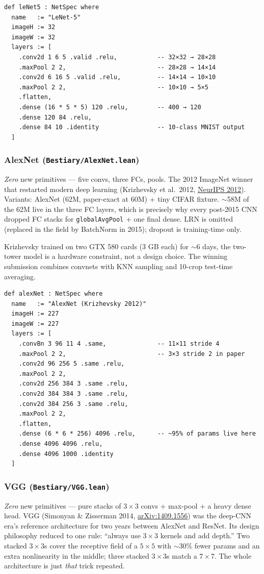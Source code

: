 \begin{verbatim}
def leNet5 : NetSpec where
  name   := "LeNet-5"
  imageH := 32
  imageW := 32
  layers := [
    .conv2d 1 6 5 .valid .relu,           -- 32×32 → 28×28
    .maxPool 2 2,                         -- 28×28 → 14×14
    .conv2d 6 16 5 .valid .relu,          -- 14×14 → 10×10
    .maxPool 2 2,                         -- 10×10 → 5×5
    .flatten,
    .dense (16 * 5 * 5) 120 .relu,        -- 400 → 120
    .dense 120 84 .relu,
    .dense 84 10 .identity                -- 10-class MNIST output
  ]
\end{verbatim}

\subsubsection*{AlexNet (\texttt{Bestiary/AlexNet.lean})}
\emph{Zero} new primitives --- five convs, three FCs, pools. The 2012
ImageNet winner that restarted modern deep learning (Krizhevsky et al.\ 2012,
\href{https://papers.nips.cc/paper_files/paper/2012/hash/c399862d3b9d6b76c8436e924a68c45b-Abstract.html}{NeurIPS 2012}). Variants:
AlexNet (62M, paper-exact at 60M) + tiny CIFAR fixture. $\sim$58M of
the 62M live in the three FC layers, which is precisely why every
post-2015 CNN dropped FC stacks for \texttt{globalAvgPool} + one final
dense. LRN is omitted (replaced in the field by BatchNorm in 2015);
dropout is training-time only.

Krizhevsky trained on two GTX 580 cards (3 GB each) for $\sim$6 days,
the two-tower model is a hardware constraint, not a design choice.
The winning submission combines convnets with KNN sampling and
10-crop test-time averaging.

\begin{verbatim}
def alexNet : NetSpec where
  name   := "AlexNet (Krizhevsky 2012)"
  imageH := 227
  imageW := 227
  layers := [
    .convBn 3 96 11 4 .same,              -- 11×11 stride 4
    .maxPool 2 2,                         -- 3×3 stride 2 in paper
    .conv2d 96 256 5 .same .relu,
    .maxPool 2 2,
    .conv2d 256 384 3 .same .relu,
    .conv2d 384 384 3 .same .relu,
    .conv2d 384 256 3 .same .relu,
    .maxPool 2 2,
    .flatten,
    .dense (6 * 6 * 256) 4096 .relu,      -- ~95% of params live here
    .dense 4096 4096 .relu,
    .dense 4096 1000 .identity
  ]
\end{verbatim}

\subsubsection*{VGG (\texttt{Bestiary/VGG.lean})}
\emph{Zero} new primitives --- pure stacks of $3\times 3$ convs +
max-pool + a heavy dense head. VGG (Simonyan \& Zisserman 2014,
\href{https://arxiv.org/abs/1409.1556}{arXiv:1409.1556}) was the
deep-CNN era's reference architecture for two years between AlexNet
and ResNet. Its design philosophy reduced to one rule: ``always use
$3\times 3$ kernels and add depth.'' Two stacked $3\times 3$s cover
the receptive field of a $5\times 5$ with $\sim$30\% fewer params
and an extra nonlinearity in the middle; three stacked $3\times 3$s
match a $7\times 7$. The whole architecture is just \emph{that}
trick repeated.

